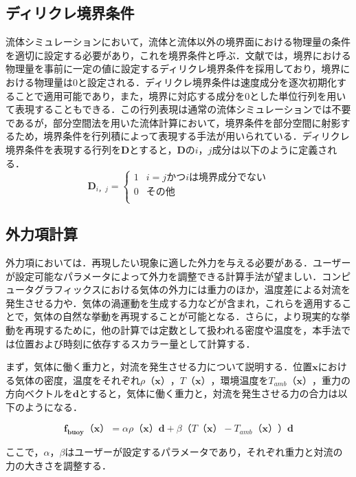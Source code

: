 \documentclass[a4j,12pt]{jreport}
\begin{document}
\subsection{ディリクレ境界条件}
流体シミュレーションにおいて，流体と流体以外の境界面における物理量の条件を適切に設定する必要があり，これを境界条件と呼ぶ．文献\cite{fedkiw}では，境界における物理量を事前に一定の値に設定するディリクレ境界条件を採用しており，境界における物理量は$0$と設定される．ディリクレ境界条件は速度成分を逐次初期化することで適用可能であり，また，境界に対応する成分を$0$とした単位行列を用いて表現することもできる．この行列表現は通常の流体シミュレーションでは不要であるが，部分空間法を用いた流体計算において，境界条件を部分空間に射影するため，境界条件を行列積によって表現する手法が用いられている．ディリクレ境界条件を表現する行列を$\mathbf{D}$とすると，$\mathbf{D}$の$i，j$成分は以下のように定義される．
\begin{equation}
	\mathbf{D}_{i，j} = \begin{cases}
 	1 	& i = j かつ iは境界成分でない\\
 	0  		& その他\\
 \end{cases}
\end{equation}


\subsection{外力項計算}
外力項においては．再現したい現象に適した外力を与える必要がある．ユーザーが設定可能なパラメータによって外力を調整できる計算手法が望ましい．コンピュータグラフィックスにおける気体の外力には重力のほか，温度差による対流を発生させる力や．気体の渦運動を生成する力などが含まれ，これらを適用することで，気体の自然な挙動を再現することが可能となる．さらに，より現実的な挙動を再現するために，他の計算では定数として扱われる密度や温度を，本手法では位置および時刻に依存するスカラー量として計算する．

まず，気体に働く重力と，対流を発生させる力について説明する．位置$\bm{x}$における気体の密度，温度をそれぞれ$\rho（\bm{x}）$，$T（\bm{x}）$，環境温度を$T_{amb}（\bm{x}）$，重力の方向ベクトルを$\bm{d}$とすると，気体に働く重力と，対流を発生させる力の合力は以下のようになる．

\begin{equation}\label{eq:buoyancy}
	\bm{f_{buoy}（\bm{x}）} =  \alpha \rho（\bm{x}）\bm{d}+ \beta（T（\bm{x}）- T_{amb}（\bm{x}））\bm{d}
\end{equation} 

ここで，$\alpha$，$\beta$はユーザーが設定するパラメータであり，それぞれ重力と対流の力の大きさを調整する．
\end{document}
